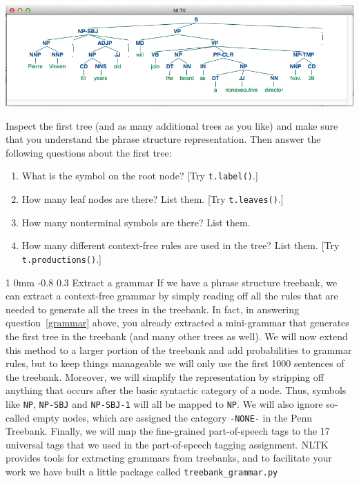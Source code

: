 \documentclass[11pt]{article}
\makeatletter
\newcommand{\newsec}[2]{\section{#1}\label{sec:#2}\noindent}
\renewcommand{\section}{\@startsection
{section}%
{1}%
{0mm}%
{-0.8\baselineskip}%
{0.3\baselineskip}%
{\bfseries\large}}%
\makeatother
\begin{document}
\begin{center}
\includegraphics[scale=0.45]{pics/nltk_tree}
\end{center}
Inspect the first tree (and as many additional trees as you like) and make sure that you understand the phrase structure representation. Then answer the following questions
about the first tree:
\newpage
\begin{enumerate}[noitemsep,topsep=0.2cm]
\item What is the symbol on the root node? [Try {\tt t.label()}.]
\item How many leaf nodes are there? List them. [Try {\tt t.leaves()}.]
\item How many nonterminal symbols are there? List them.
\item How many different context-free rules are used in the tree? List them. [Try {\tt t.productions()}.]\label{grammar}
\end{enumerate}

\newsec{Extract a grammar}{cfg}%
If we have a phrase structure treebank, we can extract a context-free grammar by simply reading off all the rules that are needed to generate all the trees in the treebank.
In fact, in answering question~\ref{grammar} above, you already extracted a mini-grammar that generates the first tree in the treebank (and many other trees as well). 
We will now extend this method to a larger portion of the treebank and add probabilities to grammar rules, 
but to keep things manageable we will only use the first 1000 sentences of the treebank. 
Moreover, we will simplify the representation by stripping off anything that occurs after the basic syntactic category of a node. Thus, symbols like {\tt NP}, {\tt NP-SBJ} 
and {\tt NP-SBJ-1} will all be mapped to {\tt NP}. We will also ignore so-called empty nodes, which are assigned the category {\tt -NONE-} in the Penn Treebank. 
Finally, we will map the fine-grained part-of-speech tags to the 17 universal tags that we used in the part-of-speech tagging assignment.
NLTK provides tools for extracting grammars from treebanks, and to facilitate your work we have built a little package called {\tt treebank\_grammar.py} 
\end{document}
